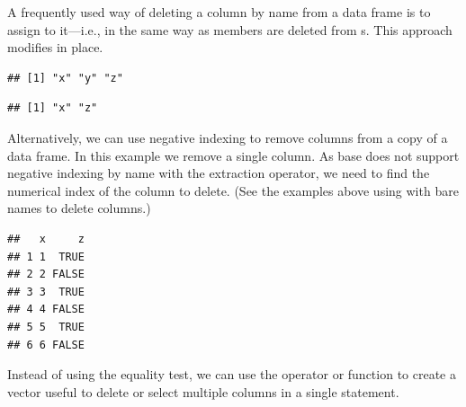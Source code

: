 \documentclass[krantz2]{krantz}\usepackage{knitr}
\begin{document}
A frequently used way of deleting a column by name from a data frame is to assign  to it---i.e., in the same way as members are deleted from s. This approach modifies  in place.

\begin{knitrout}\footnotesize
{}\color{fgcolor}\begin{kframe}
\begin{alltt}
 \hlkwb{<-} 
\end{alltt}
\begin{verbatim}
## [1] "x" "y" "z"
\end{verbatim}
\begin{alltt}
\hlstd{aa.df[[}\hlstd{]]} \hlkwb{<-} 
\end{alltt}
\begin{verbatim}
## [1] "x" "z"
\end{verbatim}
\end{kframe}
\end{knitrout}

\begin{explainbox}
Alternatively, we can use negative indexing to remove columns from a copy of a data frame. In this example we remove a single column. As base \Rlang does not support negative indexing by name with the extraction operator, we need to find the numerical index of the column to delete. (See the examples above using  with bare names to delete columns.)

\begin{knitrout}\footnotesize
{}\color{fgcolor}\begin{kframe}
\begin{alltt}
\hlstd{a.df[ ,} \hlopt{-}\hlstd{(} \hlopt{==} \hlstd{)]}
\end{alltt}
\begin{verbatim}
##   x     z
## 1 1  TRUE
## 2 2 FALSE
## 3 3  TRUE
## 4 4 FALSE
## 5 5  TRUE
## 6 6 FALSE
\end{verbatim}
\end{kframe}
\end{knitrout}

Instead of using the equality test, we can use the operator  or function  to create a  vector useful to delete or select multiple columns in a single statement.

\end{explainbox}
\end{document}
